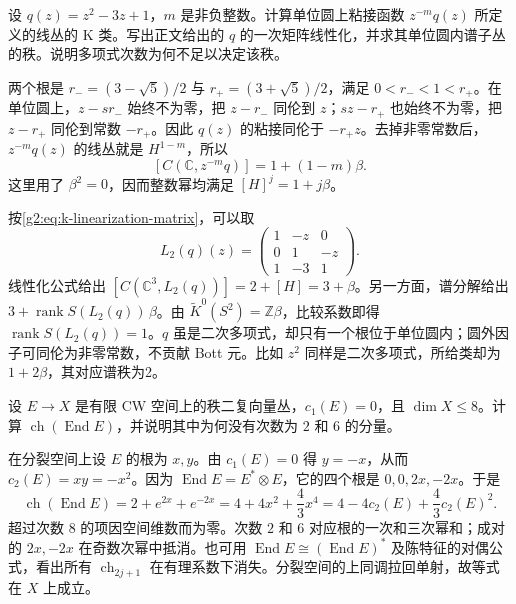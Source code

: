 \begin{exercise}\label{g2:ex:k-polynomial-winding}
	设 \(q(z)=z^2-3z+1\)，\(m\) 是非负整数。计算单位圆上粘接函数 \(z^{-m}q(z)\) 所定义的线丛的 K 类。写出正文给出的 \(q\) 的一次矩阵线性化，并求其单位圆内谱子丛的秩。说明多项式次数为何不足以决定该秩。
\end{exercise}
\begin{solution}
	两个根是 \(r_-=(3-\sqrt5)/2\) 与 \(r_+=(3+\sqrt5)/2\)，满足 \(0<r_-<1<r_+\)。在单位圆上，\(z-sr_-\) 始终不为零，把 \(z-r_-\) 同伦到 \(z\)；\(sz-r_+\) 也始终不为零，把 \(z-r_+\) 同伦到常数 \(-r_+\)。因此 \(q(z)\) 的粘接同伦于 \(-r_+z\)。去掉非零常数后，\(z^{-m}q(z)\) 的线丛就是 \(H^{1-m}\)，所以
	\[
		[C(\mathbb C,z^{-m}q)]=1+(1-m)\beta.
	\]
	这里用了 \(\beta^2=0\)，因而整数幂均满足 \([H]^j=1+j\beta\)。

	按\cref{g2:eq:k-linearization-matrix}，可以取
	\[
		L_2(q)(z)=
		\begin{pmatrix}
			1&-z&0\\
			0&1&-z\\
			1&-3&1
		\end{pmatrix}.
	\]
	线性化公式给出 \([C(\mathbb C^3,L_2(q))]=2+[H]=3+\beta\)。另一方面，谱分解给出 \(3+\operatorname{rank}S(L_2(q))\,\beta\)。由 \(\widetilde K^0(S^2)=\mathbb Z\beta\)，比较系数即得 \(\operatorname{rank}S(L_2(q))=1\)。\(q\) 虽是二次多项式，却只有一个根位于单位圆内；圆外因子可同伦为非零常数，不贡献 Bott 元。比如 \(z^2\) 同样是二次多项式，所给类却为 \(1+2\beta\)，其对应谱秩为2。
\end{solution}

\begin{exercise}\label{g2:ex:chern-endomorphism-rank-two}
	设 \(E\to X\) 是有限 CW 空间上的秩二复向量丛，\(c_1(E)=0\)，且 \(\dim X\le8\)。计算 \(\operatorname{ch}(\operatorname{End}E)\)，并说明其中为何没有次数为 \(2\) 和 \(6\) 的分量。
\end{exercise}
\begin{solution}
	在分裂空间上设 \(E\) 的根为 \(x,y\)。由 \(c_1(E)=0\) 得 \(y=-x\)，从而 \(c_2(E)=xy=-x^2\)。因为 \(\operatorname{End}E=E^*\otimes E\)，它的四个根是 \(0,0,2x,-2x\)。于是
	\[
		\operatorname{ch}(\operatorname{End}E)=2+e^{2x}+e^{-2x}
		=4+4x^2+\frac43x^4
		=4-4c_2(E)+\frac43c_2(E)^2.
	\]
	超过次数 \(8\) 的项因空间维数而为零。次数 \(2\) 和 \(6\) 对应根的一次和三次幂和；成对的 \(2x,-2x\) 在奇数次幂中抵消。也可用 \(\operatorname{End}E\cong(\operatorname{End}E)^*\) 及陈特征的对偶公式，看出所有 \(\operatorname{ch}_{2j+1}\) 在有理系数下消失。分裂空间的上同调拉回单射，故等式在 \(X\) 上成立。
\end{solution}

